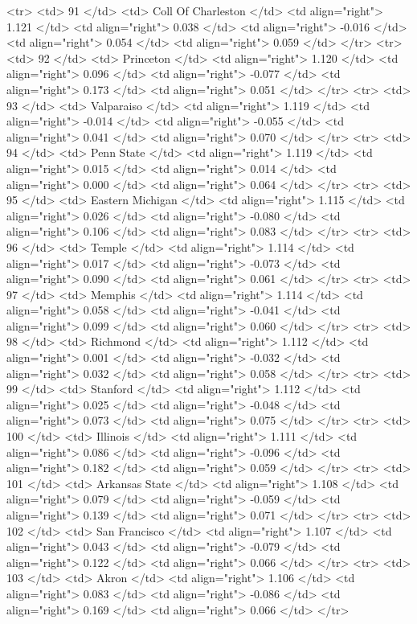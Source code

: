   <tr> <td> 91 </td> <td> Coll Of Charleston </td> <td align="right"> 1.121 </td> <td align="right"> 0.038 </td> <td align="right"> -0.016 </td> <td align="right"> 0.054 </td> <td align="right"> 0.059 </td> </tr>
  <tr> <td> 92 </td> <td> Princeton </td> <td align="right"> 1.120 </td> <td align="right"> 0.096 </td> <td align="right"> -0.077 </td> <td align="right"> 0.173 </td> <td align="right"> 0.051 </td> </tr>
  <tr> <td> 93 </td> <td> Valparaiso </td> <td align="right"> 1.119 </td> <td align="right"> -0.014 </td> <td align="right"> -0.055 </td> <td align="right"> 0.041 </td> <td align="right"> 0.070 </td> </tr>
  <tr> <td> 94 </td> <td> Penn State </td> <td align="right"> 1.119 </td> <td align="right"> 0.015 </td> <td align="right"> 0.014 </td> <td align="right"> 0.000 </td> <td align="right"> 0.064 </td> </tr>
  <tr> <td> 95 </td> <td> Eastern Michigan </td> <td align="right"> 1.115 </td> <td align="right"> 0.026 </td> <td align="right"> -0.080 </td> <td align="right"> 0.106 </td> <td align="right"> 0.083 </td> </tr>
  <tr> <td> 96 </td> <td> Temple </td> <td align="right"> 1.114 </td> <td align="right"> 0.017 </td> <td align="right"> -0.073 </td> <td align="right"> 0.090 </td> <td align="right"> 0.061 </td> </tr>
  <tr> <td> 97 </td> <td> Memphis </td> <td align="right"> 1.114 </td> <td align="right"> 0.058 </td> <td align="right"> -0.041 </td> <td align="right"> 0.099 </td> <td align="right"> 0.060 </td> </tr>
  <tr> <td> 98 </td> <td> Richmond </td> <td align="right"> 1.112 </td> <td align="right"> 0.001 </td> <td align="right"> -0.032 </td> <td align="right"> 0.032 </td> <td align="right"> 0.058 </td> </tr>
  <tr> <td> 99 </td> <td> Stanford </td> <td align="right"> 1.112 </td> <td align="right"> 0.025 </td> <td align="right"> -0.048 </td> <td align="right"> 0.073 </td> <td align="right"> 0.075 </td> </tr>
  <tr> <td> 100 </td> <td> Illinois </td> <td align="right"> 1.111 </td> <td align="right"> 0.086 </td> <td align="right"> -0.096 </td> <td align="right"> 0.182 </td> <td align="right"> 0.059 </td> </tr>
  <tr> <td> 101 </td> <td> Arkansas State </td> <td align="right"> 1.108 </td> <td align="right"> 0.079 </td> <td align="right"> -0.059 </td> <td align="right"> 0.139 </td> <td align="right"> 0.071 </td> </tr>
  <tr> <td> 102 </td> <td> San Francisco </td> <td align="right"> 1.107 </td> <td align="right"> 0.043 </td> <td align="right"> -0.079 </td> <td align="right"> 0.122 </td> <td align="right"> 0.066 </td> </tr>
  <tr> <td> 103 </td> <td> Akron </td> <td align="right"> 1.106 </td> <td align="right"> 0.083 </td> <td align="right"> -0.086 </td> <td align="right"> 0.169 </td> <td align="right"> 0.066 </td> </tr>
